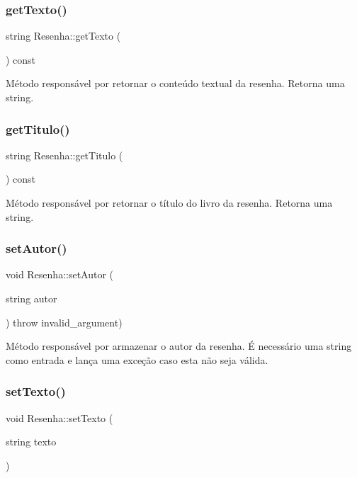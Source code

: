 \subsubsection{\texorpdfstring{get\+Texto()}{getTexto()}}
{\footnotesize\ttfamily string Resenha\+::get\+Texto (\begin{DoxyParamCaption}{ }\end{DoxyParamCaption}) const\hspace{0.3cm}{\ttfamily [inline]}}

Método responsável por retornar o conteúdo textual da resenha. Retorna uma string. \mbox{\label{classResenha_a8c0966bc51ba8d43c769594446797d9f}} 
\subsubsection{\texorpdfstring{get\+Titulo()}{getTitulo()}}
{\footnotesize\ttfamily string Resenha\+::get\+Titulo (\begin{DoxyParamCaption}{ }\end{DoxyParamCaption}) const\hspace{0.3cm}{\ttfamily [inline]}}

Método responsável por retornar o título do livro da resenha. Retorna uma string. \mbox{\label{classResenha_a93b2d590fce3efecb9d1a2a5c1ab4ef1}} 
\subsubsection{\texorpdfstring{set\+Autor()}{setAutor()}}
{\footnotesize\ttfamily void Resenha\+::set\+Autor (\begin{DoxyParamCaption}\item[{string}]{autor }\end{DoxyParamCaption}) throw  invalid\+\_\+argument) }

Método responsável por armazenar o autor da resenha. É necessário uma string como entrada e lança uma exceção caso esta não seja válida. \mbox{\label{classResenha_a6fd61b3ffeee4365aa8aaab69b16d41a}} 
\subsubsection{\texorpdfstring{set\+Texto()}{setTexto()}}
{\footnotesize\ttfamily void Resenha\+::set\+Texto (\begin{DoxyParamCaption}\item[{string}]{texto }\end{DoxyParamCaption})}

